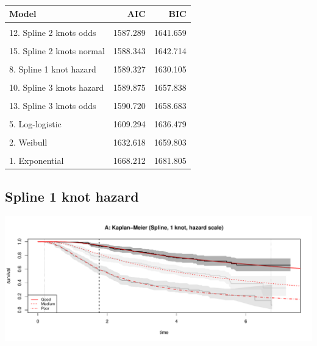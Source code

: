 \documentclass[
]{article}
\begin{document}
\begin{table}[H]
\centering
\begin{tabular}{lrr}
\toprule
Model & AIC & BIC\\
\midrule
\cellcolor{gray!6}{9. Spline 2 knots hazard} & \cellcolor{gray!6}{1585.894} & \cellcolor{gray!6}{1640.264}\\
12. Spline 2 knots odds & 1587.289 & 1641.659\\
\cellcolor{gray!6}{14. Spline 1 knot normal} & \cellcolor{gray!6}{1587.682} & \cellcolor{gray!6}{1628.460}\\
15. Spline 2 knots normal & 1588.343 & 1642.714\\
\cellcolor{gray!6}{7. Generalised Gamma} & \cellcolor{gray!6}{1589.049} & \cellcolor{gray!6}{1629.826}\\
8. Spline 1 knot hazard & 1589.327 & 1630.105\\
\cellcolor{gray!6}{16. Spline 3 knots normal} & \cellcolor{gray!6}{1589.832} & \cellcolor{gray!6}{1657.795}\\
10. Spline 3 knots hazard & 1589.875 & 1657.838\\
\cellcolor{gray!6}{11. Spline 1 knot odds} & \cellcolor{gray!6}{1590.221} & \cellcolor{gray!6}{1630.999}\\
13. Spline 3 knots odds & 1590.720 & 1658.683\\
\cellcolor{gray!6}{4. Log-normal} & \cellcolor{gray!6}{1592.880} & \cellcolor{gray!6}{1620.066}\\
5. Log-logistic & 1609.294 & 1636.479\\
\cellcolor{gray!6}{6. Gamma} & \cellcolor{gray!6}{1621.982} & \cellcolor{gray!6}{1649.167}\\
2. Weibull & 1632.618 & 1659.803\\
\cellcolor{gray!6}{3. Gompertz} & \cellcolor{gray!6}{1660.954} & \cellcolor{gray!6}{1688.140}\\
1. Exponential & 1668.212 & 1681.805\\
\bottomrule
\end{tabular}
\end{table}

\hypertarget{spline-1-knot-hazard}{%
\subsection{Spline 1 knot hazard}\label{spline-1-knot-hazard}}

\begin{flushleft}\includegraphics[height=0.25\textheight]{Images/spline_hazard1-1} \end{flushleft}
\end{document}
